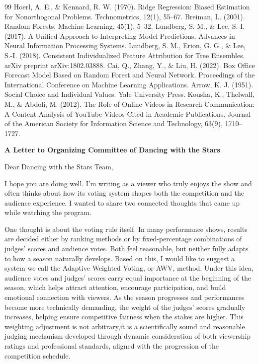 \documentclass{mcmthesis}
\begin{document}
\begin{thebibliography}{99}
Hoerl, A. E., \& Kennard, R. W. (1970).
Ridge Regression: Biased Estimation for Nonorthogonal Problems.
Technometrics, 12(1), 55--67.
Breiman, L. (2001).
Random Forests.
Machine Learning, 45(1), 5--32.
Lundberg, S. M., \& Lee, S.-I. (2017).
A Unified Approach to Interpreting Model Predictions.
Advances in Neural Information Processing Systems.
Lundberg, S. M., Erion, G. G., \& Lee, S.-I. (2018).
Consistent Individualized Feature Attribution for Tree Ensembles.
arXiv preprint arXiv:1802.03888.
Cai, Q., Zhang, Y., \& Liu, H. (2022).
Box Office Forecast Model Based on Random Forest and Neural Network.
Proceedings of the International Conference on Machine Learning Applications.
Arrow, K. J. (1951).
Social Choice and Individual Values.
Yale University Press.
Kousha, K., Thelwall, M., \& Abdoli, M. (2012).
The Role of Online Videos in Research Communication: A Content Analysis of YouTube Videos Cited in Academic Publications.
Journal of the American Society for Information Science and Technology, 63(9), 1710--1727.
\end{thebibliography}

\newpage

\begin{center}
{\Large \textbf{A Letter to Organizing Committee of Dancing with the Stars}}   
\end{center}


\vspace{0.5cm}

\noindent 
Dear Dancing with the Stars Team,

I hope you are doing well. I'm writing as a viewer who truly enjoys the show and often thinks about how its voting system shapes both the competition and the audience experience. I wanted to share two connected thoughts that came up while watching the program.

One thought is about the voting rule itself. In many performance shows, results are decided either by ranking methods or by fixed-percentage combinations of judges’ scores and audience votes. Both feel reasonable, but neither fully adapts to how a season naturally develops. Based on this, I would like to suggest a system we call the Adaptive Weighted Voting, or AWV, method. Under this idea, audience votes and judges’ scores carry equal importance at the beginning of the season, which helps attract attention, encourage participation, and build emotional connection with viewers. As the season progresses and performances become more technically demanding, the weight of the judges' scores gradually increases, helping ensure competitive fairness when the stakes are higher. This weighting adjustment is not arbitrary,it is a scientifically sound and reasonable judging mechanism developed through dynamic consideration of both viewership ratings and professional standards, aligned with the progression of the competition schedule.
\end{document}

